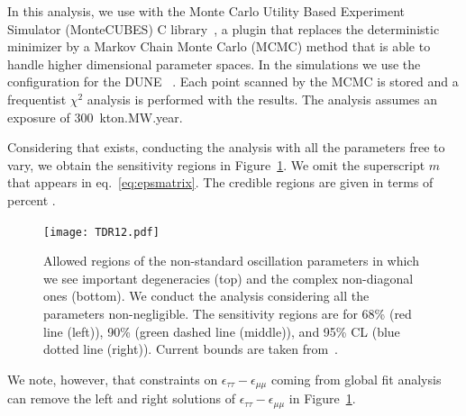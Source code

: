 In this analysis, we use  with the Monte Carlo Utility Based Experiment Simulator (MonteCUBES) C library~\cite{Blennow:2009pk}, a plugin that replaces the deterministic   minimizer by a Markov Chain Monte Carlo (MCMC) method that is able to handle higher dimensional parameter spaces. In the simulations we use the configuration for the DUNE ~\cite{Alion:2016uaj}. Each point scanned by the MCMC is stored and a frequentist $\chi^2$ analysis is performed with the results. The analysis assumes an exposure of 300~kton.MW.year.

Considering that   exists, conducting the analysis with all the   parameters free to vary, we obtain the sensitivity regions in Figure~\ref{fig:nsi}. We omit the superscript $m$ that appears in eq.~\ref{eq:epsmatrix}. 
The credible regions are given in terms of percent .
\begin{figure}[!htb]
	\centering
    \texttt{[image: TDR12.pdf]}
%    
   \caption[NSI parameters. Allowed regions.]{\label{fig:nsi}Allowed regions of the non-standard oscillation parameters in which we see important degeneracies (top) and the complex non-diagonal ones (bottom). We conduct the analysis considering all the   parameters non-negligible. The sensitivity regions are for 68\% (red line (left)), 90\% (green dashed line (middle)), and 95\% CL (blue dotted line (right)). Current bounds are taken from~\cite{Gonzalez-Garcia:2013usa}.}
\end{figure}
We note, however, that constraints on $\epsilon_{\tau\tau}-\epsilon_{\mu\mu}$ coming from global fit analysis~\cite{Gonzalez-Garcia:2013usa,Miranda:2015dra,Farzan:2017xzy,Esteban:2018ppq} can remove the left and right solutions of $\epsilon_{\tau\tau}-\epsilon_{\mu\mu}$ in Figure~\ref{fig:nsi}.

